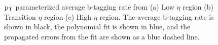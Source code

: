 \begin{figure}[htcb]
\begin{center}
\\
\\
\caption{
$\mathrm{p_{T}}$ parameterized average b-tagging rate from
(a) Low $\eta$ region  
(b) Transition $\eta$ region 
(c) High $\eta$ region. 
  The average b-tagging rate is shown in black, the polynomial fit is shown in blue, and the propagated errors from the fit are shown as a blue dashed line.}
\label{figs:tagrateetafit}
\end{center}
\end{figure}


